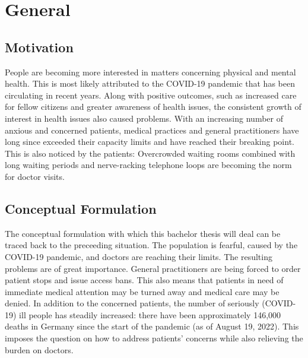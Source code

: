 
\chapter{General}

\section{Motivation}
People are becoming more interested in matters concerning physical and mental health. This is most likely attributed to the COVID-19 pandemic that has been circulating in recent years. \cite{.bahn-bonn}
Along with positive outcomes, such as increased care for fellow citizens \cite{.bahn-bonn} and greater awareness of health issues, the consistent growth of interest in health issues also caused problems.
With an increasing number of anxious and concerned patients, medical practices and general practitioners have long since exceeded their capacity limits and have reached their breaking point. \cite{.sok} This is also noticed by the patients: Overcrowded waiting rooms combined with long waiting periods and nerve-racking telephone loops are becoming the norm for doctor visits.

\section{Conceptual Formulation}
The conceptual formulation with which this bachelor thesis will deal can be traced back to the preceeding situation. The population is fearful, caused by the COVID-19 pandemic, and doctors are reaching their limits.
The resulting problems are of great importance. General practitioners are being forced to order patient stops and issue access bans. \cite{.sok} This also means that patients in need of immediate medical attention may be turned away and medical care may be denied. In addition to the concerned patients, the number of seriously (COVID-19) ill people has steadily increased: there have been approximately 146,000 deaths in Germany since the start of the pandemic (as of August 19, 2022). \cite{.rki}
This imposes the question on how to address patients' concerns while also relieving the burden on doctors.

